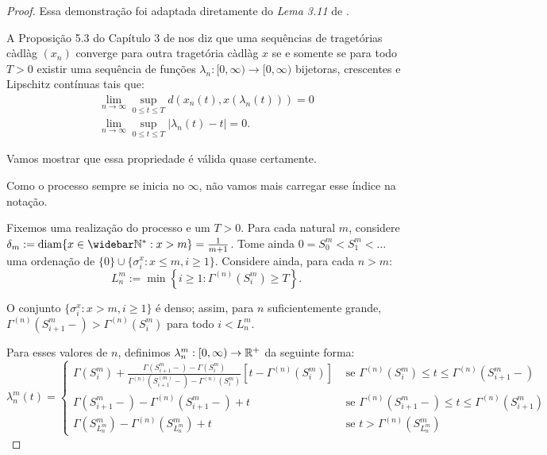 \begin{proof}
  Essa demonstração foi adaptada diretamente do \emph{Lema 3.11} de
  \cite{fontes:08}.
  
  A Proposição 5.3 do Capítulo 3 de
  \cite{ethier:86} nos diz que uma sequências de tragetórias càdlàg $(x_n)$
  converge para outra tragetória càdlàg $x$ se e somente se
  para todo $T > 0$ existir uma sequência de funções $\lambda_n:
  [0,\infty) \to [0, \infty)$ bijetoras, crescentes e Lipschitz
  contínuas tais que:
  \begin{gather*}
    \lim_{n\to\infty} \sup_{0 \leq t \leq T} d\left( x_n(t),
      x(\lambda_n(t)) \right) = 0\\
    \lim_{n\to\infty} \sup_{0 \leq t \leq T} |\lambda_n(t) - t| = 0.
  \end{gather*}
  
  Vamos mostrar que essa propriedade é válida quase certamente.

  Como o processo sempre se inicia no $\infty$, não vamos mais
  carregar esse índice na notação.

  Fixemos uma realização do processo e um $T > 0$. Para cada natural
  $m$, considere $\delta_m := \diam\{ x \in \Nzb: x > m \} =
  \frac{1}{m+1}$. Tome ainda $0 = S_0^m < S_1^m < \ldots $ uma
  ordenação de $\{0\}\cup\{ \sigma^x_i : x \leq m, i \geq
  1\}$. Considere ainda, para cada $n > m$:
  \begin{displaymath}
    L^m_n := \min \left\{ i \geq 1: \Gamma^{(n)}(S^m_i) \geq T \right\}.
  \end{displaymath}

  O conjunto $\{\sigma_i^x: x > m, i\geq 1\}$ é denso; assim, para $n$
  suficientemente grande, $\Gamma^{(n)}(S^m_{i+1}-) >
  \Gamma^{(n)}(S^m_i)$ para todo $i < L^m_n$.

  Para esses valores de $n$, definimos $\lambda_n^m: [0, \infty) \to
  {\mathbb{R}}^+$ da seguinte forma:
  \begin{displaymath}
    \lambda_n^m(t) = \begin{cases}
      \Gamma(S_i^m) + \frac{\Gamma(S_{i+1}^m-) - \Gamma(S_i^m)}
      {\Gamma^{(n)}(S_{i+1}^{(m)} -) - \Gamma^{(n)}(S_i^m)}
      \left[t - \Gamma^{(n)}(S_i^m)\right]
      & \textrm{ se }
      \Gamma^{(n)}(S_i^m) \leq t \leq \Gamma^{(n)}(S_{i+1}^m-) \\
      \Gamma(S_{i+1}^m-) - \Gamma^{(n)}(S_{i+1}^m-) + t
      & \textrm{ se }
      \Gamma^{(n)}(S_{i+1}^m-) \leq t \leq \Gamma^{(n)}(S_{i+1}^m)\\
      \Gamma(S^m_{L_n^m}) - \Gamma^{(n)}(S^m_{L_n^m}) + t
      & \textrm{ se } t > \Gamma^{(n)}(S^m_{L_n^m})
    \end{cases}
  \end{displaymath}


\end{proof}
